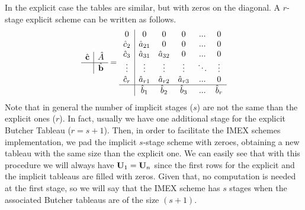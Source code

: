 In the explicit case the tables are similar, but with zeros on the diagonal. A $r$-stage explicit scheme can be written as follows.
\begin{equation*}
\begin{array}{c|c}
\hat{\mathbf{c}}&\hat{A}\\
\hline
&\hat{\mathbf{b}}
\end{array}=\begin{array}{c|ccccc}
0&0&0&0&...&0\\
\hat{c}_2&\hat{a}_{21}&0&0&...&0\\
\hat{c}_3&\hat{a}_{31}&\hat{a}_{32}&0&...&0\\
\vdots&\vdots&\vdots&\vdots&\ddots&\vdots\\
\hat{c}_r&\hat{a}_{r1}&\hat{a}_{r2}&\hat{a}_{r3}&...&0\\
\hline
&\hat{b}_1&\hat{b}_2&\hat{b}_3&...&\hat{b}_r
\end{array}
\end{equation*}
Note that in general the number of implicit stages ($s$) are not the same than the explicit ones ($r$). In fact, usually we have one additional stage for the explicit Butcher Tableau ($r=s+1$). Then, in order to facilitate the IMEX schemes implementation, we pad the implicit $s$-stage scheme with zeroes, obtaining a new tableau with the same size than the explicit one. We can easily see that with this procedure we will always have ${\bf U}_1={\bf U}_n$ since the first rows for the explicit and the implicit tableaus are filled with zeros. Given that, no computation is needed at the first stage, so we will say that the IMEX scheme has $s$ stages when the associated Butcher tableaus are of the size $(s+1)$.


